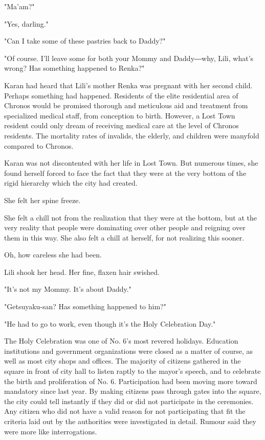 "Ma'am?"

"Yes, darling."

"Can I take some of these pastries back to Daddy?"

"Of course. I'll leave some for both your Mommy and Daddy―why, Lili,
what's wrong? Has something happened to Renka?"

Karan had heard that Lili's mother Renka was pregnant with her second
child. Perhaps something had happened. Residents of the elite
residential area of Chronos would be promised thorough and meticulous
aid and treatment from specialized medical staff, from conception to
birth. However, a Lost Town resident could only dream of receiving
medical care at the level of Chronos residents. The mortality rates of
invalids, the elderly, and children were manyfold compared to Chronos.

Karan was not discontented with her life in Lost Town. But numerous
times, she found herself forced to face the fact that they were at the
very bottom of the rigid hierarchy which the city had created.

She felt her spine freeze.

She felt a chill not from the realization that they were at the bottom,
but at the very reality that people were dominating over other people
and reigning over them in this way. She also felt a chill at herself,
for not realizing this sooner.

Oh, how careless she had been.

Lili shook her head. Her fine, flaxen hair swished.

"It's not my Mommy. It's about Daddy."

"Getsuyaku-san? Has something happened to him?"

"He had to go to work, even though it's the Holy Celebration Day."

The Holy Celebration was one of No. 6's most revered holidays. Education
institutions and government organizations were closed as a matter of
course, as well as most city shops and offices. The majority of citizens
gathered in the square in front of city hall to listen raptly to the
mayor's speech, and to celebrate the birth and proliferation of No. 6.
Participation had been moving more toward mandatory since last year. By
making citizens pass through gates into the square, the city could tell
instantly if they did or did not participate in the ceremonies. Any
citizen who did not have a valid reason for not participating that fit
the criteria laid out by the authorities were investigated in detail.
Rumour said they were more like interrogations.

